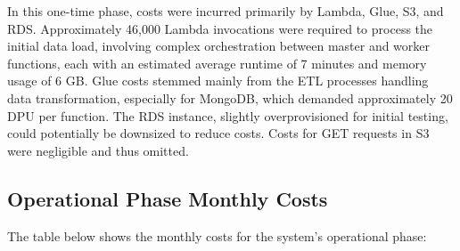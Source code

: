 In this one-time phase, costs were incurred primarily by Lambda, Glue, \ac{S3}, and \ac{RDS}. Approximately 46,000 Lambda invocations were required to process the initial data load, involving complex orchestration between master and worker functions, each with an estimated average runtime of 7 minutes and memory usage of 6 GB. Glue costs stemmed mainly from the \ac{ETL} processes handling data transformation, especially for MongoDB, which demanded approximately 20 \ac{DPU} per function. The \ac{RDS} instance, slightly overprovisioned for initial testing, could potentially be downsized to reduce costs. Costs for GET requests in \ac{S3} were negligible and thus omitted.

\subsection{Operational Phase Monthly Costs}
\label{sec:operationalcosts}
The table below shows the monthly costs for the system's operational phase:

